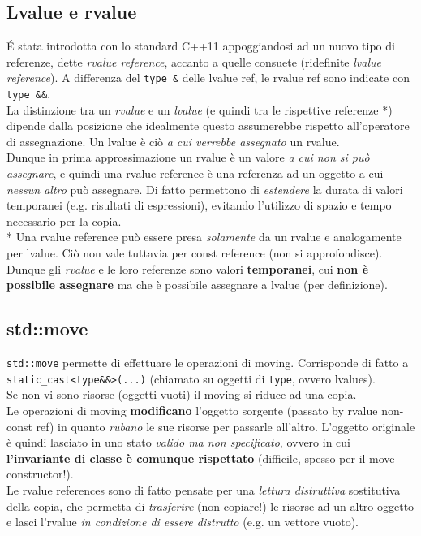 \documentclass[10pt, oneside]{book}
\begin{document}
\subsection{Lvalue e rvalue}
\'E stata introdotta con lo standard C++11 appoggiandosi ad un nuovo tipo di referenze, dette \textit{rvalue reference}, accanto a quelle consuete (ridefinite \textit{lvalue reference}). A differenza del \texttt{type \&} delle lvalue ref, le rvalue ref sono indicate con \texttt{type \&\&}.\\
La distinzione tra un \textit{rvalue} e un \textit{lvalue} (e quindi tra le rispettive referenze *) dipende dalla posizione che idealmente questo assumerebbe rispetto all'operatore di assegnazione. Un lvalue è ciò \textit{a cui verrebbe assegnato} un rvalue.\\
Dunque in prima approssimazione un rvalue è un valore \textit{a cui non si può assegnare}, e quindi una rvalue reference è una referenza ad un oggetto a cui \textit{nessun altro} può assegnare. Di fatto permettono di \textit{estendere} la durata di valori temporanei (e.g. risultati di espressioni), evitando l'utilizzo di spazio e tempo necessario per la copia.\\
* Una rvalue reference può essere presa \textit{solamente} da un rvalue e analogamente per lvalue. Ciò non vale tuttavia per const reference (non si approfondisce).\\
Dunque gli \textit{rvalue} e le loro referenze sono valori \textbf{temporanei}, cui \textbf{non è possibile assegnare} ma che è possibile assegnare a lvalue (per definizione).

\subsection{std::move}
\texttt{std::move} permette di effettuare le operazioni di moving. Corrisponde di fatto a \texttt{static\_cast<type\&\&>(...)} (chiamato su oggetti di \texttt{type}, ovvero lvalues).\\
Se non vi sono risorse (oggetti vuoti) il moving si riduce ad una copia.\\
Le operazioni di moving \textbf{modificano} l'oggetto sorgente (passato by rvalue non-const ref) in quanto \textit{rubano} le sue risorse per passarle all'altro. L'oggetto originale è quindi lasciato in uno stato \textit{valido ma non specificato}, ovvero in cui \textbf{l'invariante di classe è comunque rispettato} (difficile, spesso per il move constructor!).\\
Le rvalue references sono di fatto pensate per una \textit{lettura distruttiva} sostitutiva della copia, che permetta di \textit{trasferire} (non copiare!) le risorse ad un altro oggetto e lasci l'rvalue \textit{in condizione di essere distrutto} (e.g. un vettore vuoto).
\end{document}
